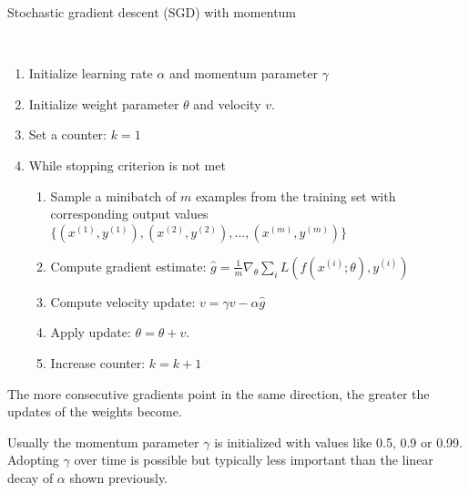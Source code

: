 \begin{algorithm}
	\caption{Stochastic gradient descent (SGD) with momentum \cite{goodfellow2016deep}}\label{alg:momentum}
	\begin{algorithmic}
		\\
		\begin{enumerate}
			\item Initialize learning rate $\alpha$ and momentum parameter $\gamma$
			\item Initialize weight parameter $\theta$ and velocity $v$.
			\item Set a counter: $k = 1$
			\item While stopping criterion is not met
			\begin{enumerate}[label=\emph{\alph*})]
				\item Sample a minibatch of $m$ examples from the training set with corresponding output values
				$\{(x^{(1)}, y^{(1)}), (x^{(2)}, y^{(2)}), ..., (x^{(m)}, y^{(m)})\}$
				\item Compute gradient estimate: $\hat{g} = \frac{1}{m} \nabla_\theta \sum_i L(f(x^{(i)};\theta), y^{(i)})$
				\item Compute velocity update: $v = \gamma v - \alpha \hat{g}$
				\item Apply update: $\theta = \theta + v$.
				\item Increase counter: $k = k + 1$
			\end{enumerate}
		\end{enumerate}
	\end{algorithmic}
\end{algorithm}

\begin{remark}
	The more consecutive gradients point in the same direction, the greater the updates of the weights become. 
\end{remark}

\begin{remark}
	Usually the momentum parameter $\gamma$ is initialized with values like 0.5, 0.9 or 0.99. Adopting $\gamma$ over time is possible but typically less important than the linear decay of $\alpha$ shown previously. 
\end{remark}

